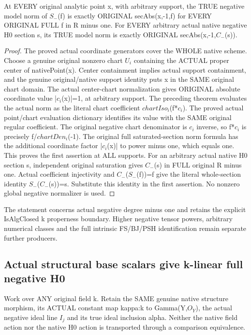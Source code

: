 \begin{theorem}
\label{thm:seven-native-full-negative-model-norm-dictionary}
\leanok
At EVERY original analytic point x, with arbitrary support, the TRUE
negative model norm of $S_-$(f) is exactly ORIGINAL secAbs(x,-1,f) for
EVERY ORIGINAL FULL f in R minus one. For EVERY arbitrary actual native
negative H0 section s, its TRUE model norm is exactly
ORIGINAL secAbs(x,-1,$C_-$(s)).
\end{theorem}
\begin{proof}
The proved actual coordinate generators cover the WHOLE native scheme.
Choose a genuine original nonzero chart $U_i$ containing the ACTUAL
proper center of nativePoint(x). Center containment implies actual
support containment, and the genuine original/native support identity
puts x in the SAME original chart domain. The actual center-chart
normalization gives ORIGINAL absolute coordinate value |$c_i$(x)|=1,
at arbitrary support. The preceding theorem evaluates the actual norm
as the literal chart coefficient $chartIso_i$(f*$c_i$). The proved actual
point/chart evaluation dictionary identifies its value with the SAME
original regular coefficient. The original negative chart denominator
is $c_i$ inverse, so f*$c_i$ is precisely f/$chartDen_i$(-1). The original
full saturated-section norm formula has the additional coordinate
factor |$c_i$(x)| to power minus one, which equals one. This proves the
first assertion at ALL supports. For an arbitrary actual native H0
section s, independent original saturation gives $C_-$(s) in FULL original
R minus one. Actual coefficient injectivity and $C_-$($S_-$(f))=f give the
literal whole-section identity $S_-$($C_-$(s))=s. Substitute this identity
in the first assertion. No nonzero global negative normalizer is used.
\end{proof}

The statement concerns actual negative degree minus one and retains
the explicit IsAlgClosed k properness boundary. Higher negative tensor
powers, arbitrary numerical classes and the full intrinsic FS/BJ/PSH
identification remain separate further producers.

\subsection{Actual structural base scalars give k-linear full negative H0}
Work over ANY original field k. Retain the SAME genuine native structure
morphism, its ACTUAL constant map kappa:k to Gamma(Y,$O_Y$), the actual
negative ideal line $I_j$ and its true ideal inclusion alpha. Neither the
native field action nor the native H0 action is transported through a
comparison equivalence.

